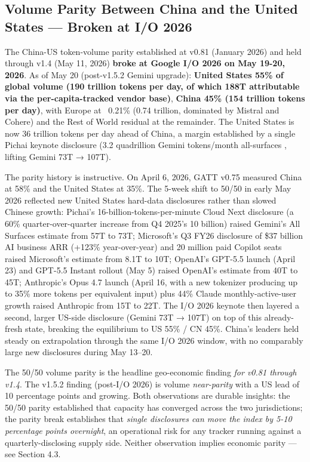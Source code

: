 \documentclass[11pt,a4paper]{article}
\begin{document}
\subsection{Volume Parity Between China and the United States --- Broken at I/O 2026}

The China-US token-volume parity established at v0.81 (January 2026) and held through v1.4 (May 11, 2026) \textbf{broke at Google I/O 2026 on May 19-20, 2026}. As of May 20 (post-v1.5.2 Gemini upgrade): \textbf{United States 55\% of global volume (190 trillion tokens per day, of which 188T attributable via the per-capita-tracked vendor base)}, \textbf{China 45\% (154 trillion tokens per day)}, with Europe at ~0.21\% (0.74 trillion, dominated by Mistral and Cohere) and the Rest of World residual at the remainder. The United States is now 36 trillion tokens per day ahead of China, a margin established by a single Pichai keynote disclosure (3.2 quadrillion Gemini tokens/month all-surfaces \cite{pichai2026io}, lifting Gemini 73T → 107T).

The parity history is instructive. On April 6, 2026, GATT v0.75 measured China at 58\% and the United States at 35\%. The 5-week shift to 50/50 in early May 2026 reflected new United States hard-data disclosures rather than slowed Chinese growth: Pichai's 16-billion-tokens-per-minute Cloud Next disclosure (a 60\% quarter-over-quarter increase from Q4 2025's 10 billion) raised Gemini's All Surfaces estimate from 57T to 73T; Microsoft's Q3 FY26 disclosure of \$37 billion AI business ARR (+123\% year-over-year) and 20 million paid Copilot seats raised Microsoft's estimate from 8.1T to 10T; OpenAI's GPT-5.5 launch (April 23) and GPT-5.5 Instant rollout (May 5) raised OpenAI's estimate from 40T to 45T; Anthropic's Opus 4.7 launch (April 16, with a new tokenizer producing up to 35\% more tokens per equivalent input) plus 44\% Claude monthly-active-user growth raised Anthropic from 15T to 22T. The I/O 2026 keynote then layered a second, larger US-side disclosure (Gemini 73T → 107T) on top of this already-fresh state, breaking the equilibrium to US 55\% / CN 45\%. China's leaders held steady on extrapolation through the same I/O 2026 window, with no comparably large new disclosures during May 13–20.

The 50/50 volume parity is the headline geo-economic finding \emph{for v0.81 through v1.4}. The v1.5.2 finding (post-I/O 2026) is volume \emph{near-parity} with a US lead of 10 percentage points and growing. Both observations are durable insights: the 50/50 parity established that capacity has converged across the two jurisdictions; the parity break establishes that \emph{single disclosures can move the index by 5-10 percentage points overnight}, an operational risk for any tracker running against a quarterly-disclosing supply side. Neither observation implies economic parity --- see Section 4.3.
\end{document}
